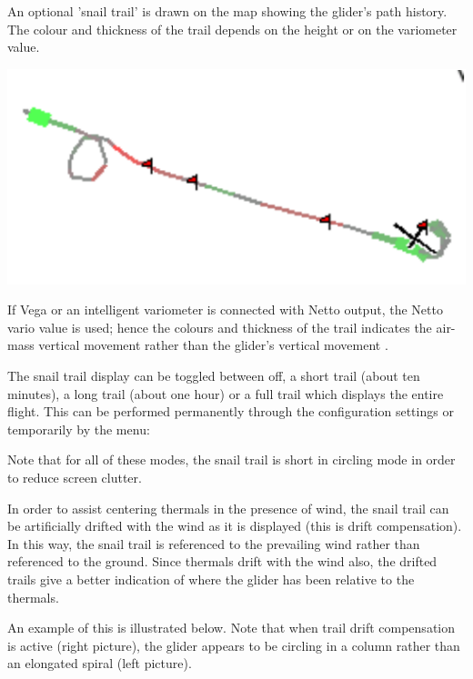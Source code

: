 An optional 'snail trail' is drawn on the map showing the glider's
path history.  The colour and thickness of the trail depends on the height or
on the variometer value.  

\begin{center}
\includegraphics[angle=0,width=0.8\linewidth,keepaspectratio='true']{figures/snail.pdf}
\end{center}

If Vega or an intelligent variometer is connected with Netto output,
the Netto vario value is used; hence the colours and thickness of the
trail indicates the air-mass vertical movement rather than the glider's
vertical movement	.

The snail trail display can be toggled between off, a short trail
(about ten minutes), a long trail (about one hour) or a full trail
which displays the entire flight.  This can be performed permanently
through the configuration  settings or temporarily by the
menu:
\begin{quote}
\blink{}\blink{}
\end{quote}

Note that for all of these modes, the snail trail is short in
circling mode in order to reduce screen clutter.

In order to assist centering thermals in the presence of wind, the
snail trail can be artificially drifted with the wind as it is
displayed (this is drift compensation).  In this way, the snail trail
is referenced to the prevailing wind rather than referenced to the
ground.  Since thermals drift with the wind also, the drifted trails
give a better indication of where the glider has been relative to the
thermals.

An example of this is illustrated below.  Note that when trail drift
compensation is active (right picture), the glider appears to be
circling in a column rather than an elongated spiral (left picture).

